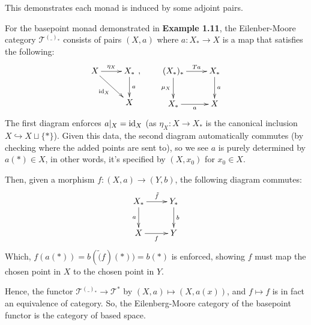 \documentclass{article}
\begin{document}
This demonstrates each monad is induced by some adjoint pairs.

\begin{exmp}
    For the basepoint monad demonstrated in \textbf{Example 1.11}, the Eilenber-Moore category $\mathcal{T}^{(\_)_*}$ consists of pairs $(X,a)$ where $a:X_*\rightarrow X$ is a map that satisfies the following:
    \[\xymatrix{
        X \ar[dr]_-{\id_X} \ar[r]^-{\eta_X} & X_* \ar[d]^-{a}\\
        & X
    },\quad\quad \xymatrix{
        (X_*)_* \ar[r]^-{Ta} \ar[d]_-{\mu_X} & X_* \ar[d]^-{a}\\
        X_* \ar[r]_-{a} & X
    }\]
    The first diagram enforces $a|_X = \mathrm{id}_X$ (as $\eta_X:X\rightarrow X_*$ is the canonical inclusion $X\hookrightarrow X\sqcup\{*\}$). Given this data, the second diagram automatically commutes (by checking where the added points are sent to), so we see $a$ is purely determined by $a(*)\in X$, in other words, it's specified by $(X,x_0)$ for $x_0\in X$.

    Then, given a morphism $f:(X,a)\rightarrow (Y,b)$, the following diagram commutes:
    \[\xymatrix{
        X_* \ar[d]_-{a} \ar[r]^-{\tilde{f}} & Y_* \ar[d]^-{b}\\
        X \ar[r]_-{f} & Y
    }\]
    Which, $f(a(*))= b(\tilde(f)(*))=b(*)$ is enforced, showing $f$ must map the chosen point in $X$ to the chosen point in $Y$.

    Hence, the functor $\mathcal{T}^{(\_)_*}\rightarrow \mathcal{T}^*$ by $(X,a)\mapsto (X,a(x))$, and $f\mapsto f$ is in fact an equivalence of category. So, the Eilenberg-Moore category of the basepoint functor is the category of based space.
\end{exmp}

\hfil
\end{document}
